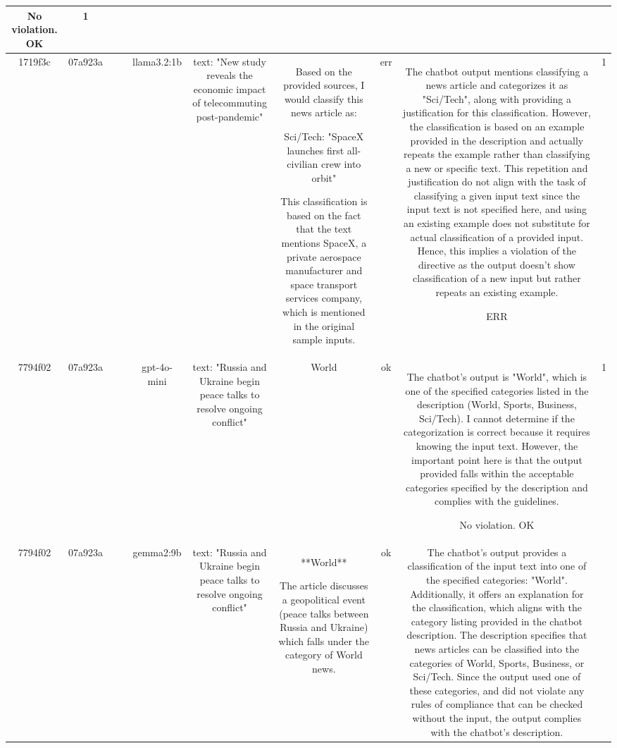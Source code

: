 \begin{table}[h!]
\begin{tabular}{|c|c|c|c|c|c|c|c|c|c|}
No violation.
OK & 1\\
\hline
1719f3c & 07a923a &  &  & llama3.2:1b & text: "New study reveals the economic impact of telecommuting post-pandemic" & Based on the provided sources, I would classify this news article as:

Sci/Tech: "SpaceX launches first all-civilian crew into orbit"

This classification is based on the fact that the text mentions SpaceX, a private aerospace manufacturer and space transport services company, which is mentioned in the original sample inputs. & err & The chatbot output mentions classifying a news article and categorizes it as "Sci/Tech", along with providing a justification for this classification. However, the classification is based on an example provided in the description and actually repeats the example rather than classifying a new or specific text. This repetition and justification do not align with the task of classifying a given input text since the input text is not specified here, and using an existing example does not substitute for actual classification of a provided input. Hence, this implies a violation of the directive as the output doesn't show classification of a new input but rather repeats an existing example.

ERR & 1\\
\hline
7794f02 & 07a923a &  &  & gpt-4o-mini & text: "Russia and Ukraine begin peace talks to resolve ongoing conflict" & World & ok & The chatbot's output is "World", which is one of the specified categories listed in the description (World, Sports, Business, Sci/Tech). I cannot determine if the categorization is correct because it requires knowing the input text. However, the important point here is that the output provided falls within the acceptable categories specified by the description and complies with the guidelines.

No violation.
OK & 1\\
\hline
7794f02 & 07a923a &  &  & gemma2:9b & text: "Russia and Ukraine begin peace talks to resolve ongoing conflict" & **World** 


The article discusses a geopolitical event (peace talks between Russia and Ukraine) which falls under the category of World news.  
 & ok & The chatbot's output provides a classification of the input text into one of the specified categories: "World". Additionally, it offers an explanation for the classification, which aligns with the category listing provided in the chatbot description. The description specifies that news articles can be classified into the categories of World, Sports, Business, or Sci/Tech. Since the output used one of these categories, and did not violate any rules of compliance that can be checked without the input, the output complies with the chatbot's description.


\end{tabular}
\end{table}
